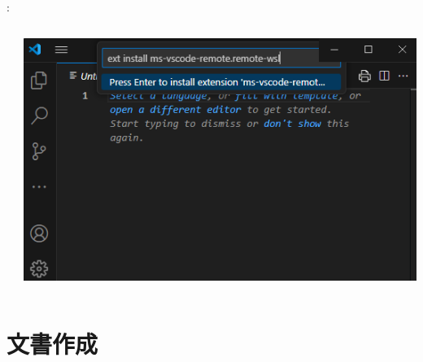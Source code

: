 \documentclass[aspectratio=169,dvipdfmx,cjk]{beamer}
\begin{document}
\begin{frame}{\insertsection \thesubsection: \insertsubsection}
\begin{columns}
\begin{column}{0.33\textwidth}
    \end{column}
    \begin{column}{0.3\textwidth}
      \includegraphics[width=1.0\linewidth]{fig/vscode-wsl.png}
    \end{column}
  \end{columns}
\end{frame}

\section{文書作成}
\end{document}
